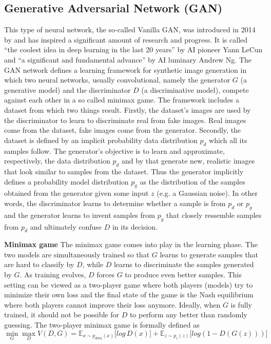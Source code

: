 \documentclass[11pt,a4paper]{article}
\begin{document}
\subsection{Generative Adversarial Network (GAN)}
This type of neural network, the so-called Vanilla GAN, was introduced in 2014 by \cite{1406.2661} and has inspired a significant amount of research and progress. It is called ``the coolest idea in deep learning in the last 20 years'' by AI pioneer Yann LeCun and ``a significant and fundamental advance'' by AI luminary Andrew Ng. The GAN network defines a learning framework for synthetic image generation in which two neural networks, usually convolutional, namely the generator $G$ (a generative model) and the discriminator $D$ (a discriminative model), compete against each other in a so called minimax game. The framework includes a dataset from which two things result. Firstly, the dataset's images are used by the discriminator to learn to discriminate real from fake images. Real images come from the dataset, fake images come from the generator. Secondly, the dataset is defined by an implicit probability data distribution $p_d$ which all its samples follow. The generator's objective is to learn and approximate, respectively, the data distribution $p_d$ and by that generate new, realistic images that look similar to samples from the dataset. Thus the generator implicitly defines a probability model distribution $p_g$ as the distribution of the samples obtained from the generator given some input $z$ (e.g. a Gaussian noise). In other words, the discriminator learns to determine whether a sample is from $p_d$ or $p_g$ and the generator learns to invent samples from $p_g$ that closely ressemble samples from $p_d$ and ultimately confuse $D$ in its decision.
\par \textbf{Minimax game} The minimax game comes into play in the learning phase. The two models are simultaneously trained so that $G$ learns to generate samples that are hard to classify by $D$, while $D$ learns to discriminate the samples generated by $G$. As training evolves, $D$ forces $G$ to produce even better samples. This setting can be viewed as a two-player game where both players (models) try to minimize their own loss and the final state of the game is the Nash equilibrium where both players cannot improve their loss anymore. Ideally, when $G$ is fully trained, it should not be possible for $D$ to perform any better than randomly guessing. The two-player minimax game is formally defined as
\begin{equation} \label{eq:1}
\min\limits_{G} \max\limits_{D} V(D,G) = \mathbb{E}_{x\sim p_{data} (x)}\big[log\, D(x)\big] + \mathbb{E}_{z\sim p_{z} (z)}\big[log(1 - D(G(z)))\big]
\end{equation}
\end{document}
